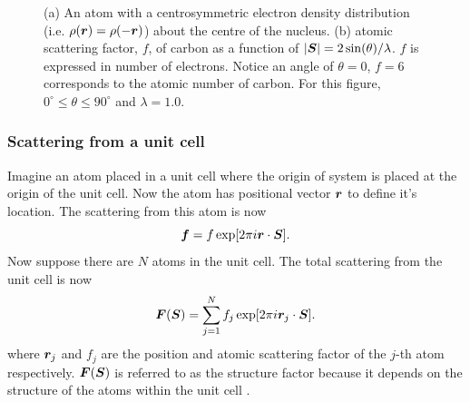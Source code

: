 \begin{figure}
\begin{subfigure}[b]{0.5\textwidth}
                        \caption{}
                        \label{fig:carbon atomic scattering factor}
                \end{subfigure}
                \caption{(a) An atom with a centrosymmetric electron density distribution (i.e. $\rho(\boldsymbol{r}) = \rho(-\boldsymbol{r})$) about the centre of the nucleus. (b) atomic scattering factor, $f$, of carbon as a function of $|\boldsymbol{S}| = 2 \sin(\theta)/\lambda$. $f$ is expressed in number of electrons. Notice an angle of $\theta = 0$, $f=6$ corresponds to the atomic number of carbon. For this figure, $0^{\circ} \leq \theta \leq 90^{\circ}$ and $\lambda = 1.0$.}
        		\label{fig:Scattering from an atom}
            \end{figure}

        \subsubsection{Scattering from a unit cell}
        \label{subs:Scattering from a unit cell}
            Imagine an atom placed in a unit cell where the origin of system is placed at the origin of the unit cell. Now the atom has positional vector $\boldsymbol{r}$ to define it's location. The scattering from this atom is now
            \begin{equation}
                \boldsymbol{f} = f \exp[2 \pi i \boldsymbol{r} \cdot \boldsymbol{S}].
            \end{equation}
            Now suppose there are $N$ atoms in the unit cell. The total scattering from the unit cell is now
            \begin{equation}
                \boldsymbol{F}(\boldsymbol{S}) = \sum_{j=1}^N f_j \exp[2 \pi i \boldsymbol{r}_j \cdot \boldsymbol{S}].
                \label{eq:structure factor equation - summation}
            \end{equation}
            where $\boldsymbol{r}_j$ and $f_j$ are the position and atomic scattering factor of the $j$-th atom respectively. $\boldsymbol{F}(\boldsymbol{S})$ is referred to as the structure factor because it depends on the structure of the atoms within the unit cell \cite{drenth2012}.

